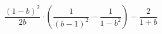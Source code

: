 \begin{ex}[type=expression]
	\begin{condition}
		\( \dfrac{(1-b)^2}{2b}\cdot\left( \dfrac{1}{(b-1)^2}-\dfrac{1}{1-b^2} \right) -\dfrac{2}{1+b}\)
	\end{condition}
\end{ex}